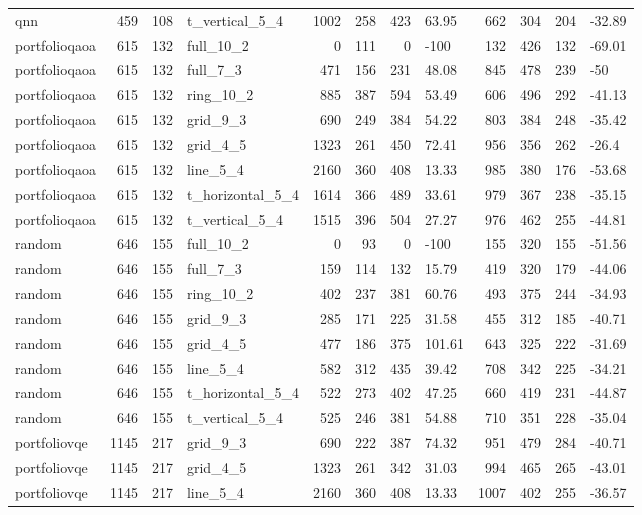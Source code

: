\begin{longtable}{lrrlrrrlrrrl}
qnn & 459 & 108 & t\_vertical\_5\_4 & 1002 & 258 & 423 & 63.95 & 662 & 304 & 204 & -32.89 \\
portfolioqaoa & 615 & 132 & full\_10\_2 & 0 & 111 & 0 & -100 & 132 & 426 & 132 & -69.01 \\
portfolioqaoa & 615 & 132 & full\_7\_3 & 471 & 156 & 231 & 48.08 & 845 & 478 & 239 & -50 \\
portfolioqaoa & 615 & 132 & ring\_10\_2 & 885 & 387 & 594 & 53.49 & 606 & 496 & 292 & -41.13 \\
portfolioqaoa & 615 & 132 & grid\_9\_3 & 690 & 249 & 384 & 54.22 & 803 & 384 & 248 & -35.42 \\
portfolioqaoa & 615 & 132 & grid\_4\_5 & 1323 & 261 & 450 & 72.41 & 956 & 356 & 262 & -26.4 \\
portfolioqaoa & 615 & 132 & line\_5\_4 & 2160 & 360 & 408 & 13.33 & 985 & 380 & 176 & -53.68 \\
portfolioqaoa & 615 & 132 & t\_horizontal\_5\_4 & 1614 & 366 & 489 & 33.61 & 979 & 367 & 238 & -35.15 \\
portfolioqaoa & 615 & 132 & t\_vertical\_5\_4 & 1515 & 396 & 504 & 27.27 & 976 & 462 & 255 & -44.81 \\
random & 646 & 155 & full\_10\_2 & 0 & 93 & 0 & -100 & 155 & 320 & 155 & -51.56 \\
random & 646 & 155 & full\_7\_3 & 159 & 114 & 132 & 15.79 & 419 & 320 & 179 & -44.06 \\
random & 646 & 155 & ring\_10\_2 & 402 & 237 & 381 & 60.76 & 493 & 375 & 244 & -34.93 \\
random & 646 & 155 & grid\_9\_3 & 285 & 171 & 225 & 31.58 & 455 & 312 & 185 & -40.71 \\
random & 646 & 155 & grid\_4\_5 & 477 & 186 & 375 & 101.61 & 643 & 325 & 222 & -31.69 \\
random & 646 & 155 & line\_5\_4 & 582 & 312 & 435 & 39.42 & 708 & 342 & 225 & -34.21 \\
random & 646 & 155 & t\_horizontal\_5\_4 & 522 & 273 & 402 & 47.25 & 660 & 419 & 231 & -44.87 \\
random & 646 & 155 & t\_vertical\_5\_4 & 525 & 246 & 381 & 54.88 & 710 & 351 & 228 & -35.04 \\
portfoliovqe & 1145 & 217 & grid\_9\_3 & 690 & 222 & 387 & 74.32 & 951 & 479 & 284 & -40.71 \\
portfoliovqe & 1145 & 217 & grid\_4\_5 & 1323 & 261 & 342 & 31.03 & 994 & 465 & 265 & -43.01 \\
portfoliovqe & 1145 & 217 & line\_5\_4 & 2160 & 360 & 408 & 13.33 & 1007 & 402 & 255 & -36.57 \\

\end{longtable}
